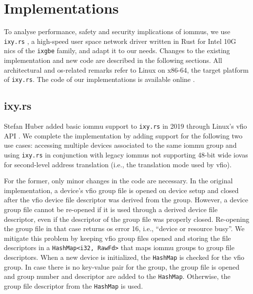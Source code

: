 \chapter{Implementations}
\label{chap:implementations}

To analyse performance, safety and security implications of \acp{iommu}, we use
\texttt{ixy.rs} \cite{ellmann2018writing}, a high-speed user space network
driver written in Rust for Intel 10G \acp{nic} of the \texttt{ixgbe} family, and
adapt it to our needs. Changes to the existing implementation and new code are
described in the following sections. All architectural and \ac{os}-related
remarks refer to Linux on x86-64, the target platform of \texttt{ixy.rs}. The
code of our implementations is available online \cite{ellmann2021ixy,
ellmann2021iommuleaks}.


\section{ixy.rs}
\label{sec:ixy_rs}

Stefan Huber added basic \ac{iommu} support to \texttt{ixy.rs} in 2019 through
Linux's \ac{vfio} API \cite{huber2019using}. We complete the implementation by
adding support for the following two use cases: accessing multiple devices
associated to the same \ac{iommu} group and using \texttt{ixy.rs} in conjunction
with legacy \acp{iommu} not supporting 48-bit wide \acp{iova} for second-level
address translation (i.e., the translation mode used by \ac{vfio}).

For the former, only minor changes in the code are necessary. In the original
implementation, a device's \ac{vfio} group file is opened on device setup and
closed after the \ac{vfio} device file descriptor was derived from the group.
However, a device group file cannot be re-opened if it is used through a derived
device file descriptor, even if the descriptor of the group file was properly
closed. Re-opening the group file in that case returns \ac{os} error 16, i.e.,
``device or resource busy''. We mitigate this problem by keeping \ac{vfio} group
files opened and storing the file descriptors in a \texttt{HashMap<i32, RawFd>}
that maps \ac{iommu} groups to group file descriptors. When a new device is
initialized, the \texttt{HashMap} is checked for the \ac{vfio} group. In case
there is no key-value pair for the group, the group file is opened and group
number and descriptor are added to the \texttt{HashMap}. Otherwise, the group
file descriptor from the \texttt{HashMap} is used.

